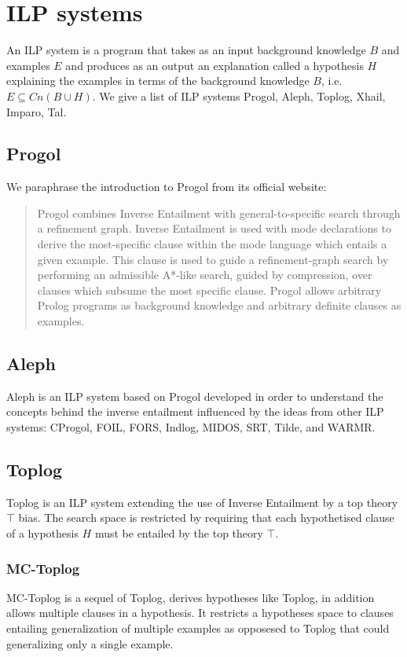 \section{ILP systems}
An ILP system is a program that takes as an input background knowledge $B$ and examples $E$ and produces as an output an explanation called a hypothesis $H$ explaining the examples in terms of the background knowledge $B$, i.e. $E \subseteq Cn(B \cup H)$.
We give a list of ILP systems Progol, Aleph, Toplog, Xhail, Imparo, Tal.

\subsection{Progol}
We paraphrase the introduction to Progol from its official website\cite{muggleton1999progolWebsite}:
\begin{quote}
Progol combines Inverse Entailment with general-to-specific search through a refinement graph. Inverse Entailment is used with mode declarations to derive the most-specific clause within the mode language which entails a given example. This clause is used to guide a refinement-graph search by performing an admissible A*-like search, guided by compression, over clauses which subsume the most specific clause. Progol allows arbitrary Prolog programs as background knowledge and arbitrary definite clauses as examples.
\end{quote}

\subsection{Aleph\cite{aleph2007}}
Aleph is an ILP system based on Progol developed in order to understand the concepts behind the inverse entailment\cite{muggleton1995inverse} influenced by the ideas from other ILP systems: CProgol, FOIL, FORS, Indlog, MIDOS, SRT, Tilde, and WARMR. 

\subsection{Toplog\cite{santos2008toplogWebsite}\cite{muggleton2008toplog}}
Toplog is an ILP system extending the use of Inverse Entailment by a top theory $\top$ bias.
The search space is restricted by requiring that each hypothetised clause of a hypothesis $H$ must be entailed by the top theory $\top$.

\subsubsection{MC-Toplog\cite{muggleton2012mc}}
MC-Toplog is a sequel of Toplog, derives hypotheses like Toplog, in addition allows multiple clauses in a hypothesis. It restricts a hypotheses space to clauses entailing generalization of multiple examples as opposesed to Toplog that could generalizing only a single example.

